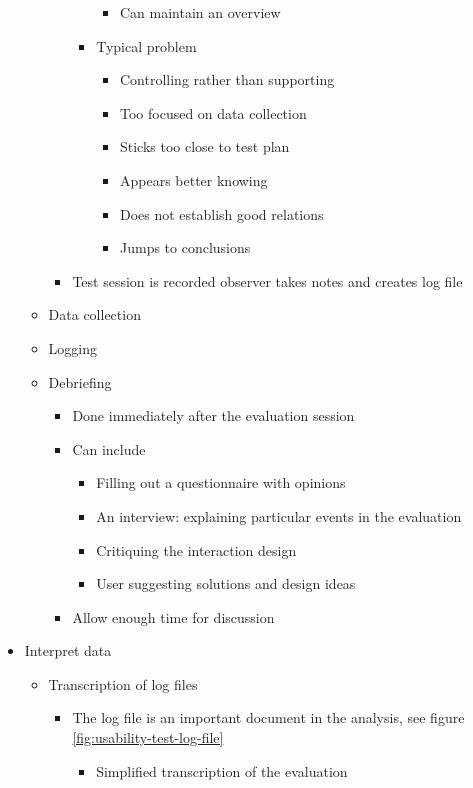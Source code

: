 \begin{itemize}
\begin{itemize}
\begin{itemize}
\begin{itemize}
\begin{itemize}
					\item Can maintain an overview
				\end{itemize}
				\item Typical problem
				\begin{itemize}
					\item Controlling rather than supporting
					\item Too focused on data collection
					\item Sticks too close to test plan
					\item Appears better knowing
					\item Does not establish good relations
					\item Jumps to conclusions
				\end{itemize}
			\end{itemize}
			\item Test session is recorded observer takes notes and creates log file
		\end{itemize}
		\item Data collection
		\item Logging
		\item Debriefing
		\begin{itemize}
			\item Done immediately after the evaluation session
			\item Can include
			\begin{itemize}
				\item Filling out a questionnaire with opinions
				\item An interview: explaining particular events in the evaluation
				\item Critiquing the interaction design
				\item User suggesting solutions and design ideas
			\end{itemize}
			\item Allow enough time for discussion
		\end{itemize}
	\end{itemize}
	\item Interpret data
	\begin{itemize}
		\item Transcription of log files
		\begin{itemize}
			\item The log file is an important document in the analysis, see figure \ref{fig:usability-test-log-file}
			\begin{itemize}
				\item Simplified transcription of the evaluation

\end{itemize}
\end{itemize}
\end{itemize}
\end{itemize}
